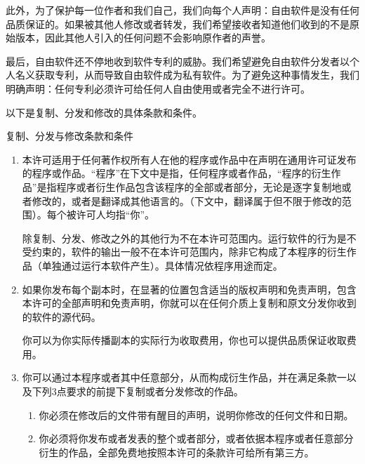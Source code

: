 \documentclass[11pt]{article}
\begin{document}
此外，为了保护每一位作者和我们自己，我们向每个人声明：自由软件是没有任何品质保证的。如果被其他人修改或者转发，我们希望接收者知道他们收到的不是原始版本，因此其他人引入的任何问题不会影响原作者的声誉。

最后，自由软件还不停地收到软件专利的威胁。我们希望避免自由软件分发者以个人名义获取专利，从而导致自由软件成为私有软件。为了避免这种事情发生，我们明确声明：任何专利必须许可给任何人自由使用或者完全不进行许可。

以下是复制、分发和修改的具体条款和条件。

\begin{center}
{\Large \sc 复制、分发与修改条款和条件}
\end{center}

\begin{enumerate}

\addtocounter{enumi}{-1}

\item 

本许可适用于任何著作权所有人在他的程序或作品中在声明在通用许可证发布的程序或作品。“程序”在下文中是指，任何程序或者作品，“程序的衍生作品”是指程序或者衍生作品包含该程序的全部或者部分，无论是逐字复制地或者修改的，或者是翻译成其他语言的。（下文中，翻译属于但不限于修改的范围）。每个被许可人均指“你”。

除复制、分发、修改之外的其他行为不在本许可范围内。运行软件的行为是不受约束的，软件的输出一般不在本许可范围内，除非它构成了本程序的衍生作品（单独通过运行本软件产生）。具体情况依程序用途而定。

\item 如果你发布每个副本时，在显著的位置包含适当的版权声明和免责声明，包含本许可的全部声明和免责声明，你就可以在任何介质上复制和原文分发你收到的软件的源代码。

你可以为你实际传播副本的实际行为收取费用，你也可以提供品质保证收取费用。

\item

你可以通过本程序或者其中任意部分，从而构成衍生作品，并在满足条款一以及下列3点要求的前提下复制或者分发修改的作品。

\begin{enumerate}

\item 

你必须在修改后的文件带有醒目的声明，说明你修改的任何文件和日期。

\item

你必须将你发布或者发表的整个或者部分，或者依据本程序或者任意部分衍生的作品，全部免费地按照本许可的条款许可给所有第三方。


\end{enumerate}
\end{enumerate}
\end{document}

